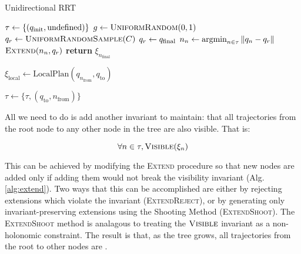 \documentclass[conference]{IEEEtran}
\newcommand{\argmin}{\operatornamewithlimits{argmin}}
\begin{document}
\begin{algorithm}
\caption{Unidirectional RRT}\label{alg:RRT}
\begin{algorithmic}[1]
   \State$\tau \gets \{(q_{\text{init}}, \text{undefined})\}$
       \State $g \gets \textsc{UniformRandom}(0, 1)$  
       		\State $q_r \gets \textsc{UniformRandomSample}(C)$
       \Else
       		 \State $q_r \gets q_{\text{final}}$
       \EndIf
       \State $n_n \gets \argmin_{n \in \tau} \|q_n - q_r\|$
       \State $\textsc{Extend}(n_n, q_r)$ 
   \EndWhile
   \State \textbf{return} $\xi_{n_{\text{final}}}$
\EndProcedure

    \State $\xi_{\text{local}}  \gets \text{LocalPlan}(q_{n_{\text{from}}},
    q_{\text{to}})$
    
         \State $\tau \gets \{\tau, (q_{\text{to}}, n_{\text{from}})\}$
    \EndIf    
\EndProcedure

\end{algorithmic}
\end{algorithm}

All we need to do is add another invariant to maintain: that all
trajectories from the root node to any other node in the tree are also
visible. That is:

\begin{equation}
    \forall n \in \tau, \textsc{Visible}(\xi_n)
\end{equation} 

This can be achieved by modifying the \textsc{Extend} procedure so that new
nodes are added only if adding them would not break the visibility invariant
(Alg. \ref{alg:extend}).
Two ways that this can be accomplished are either by rejecting extensions which
violate the invariant (\textsc{ExtendReject}), or by generating only
invariant-preserving extensions using the Shooting Method
(\textsc{ExtendShoot}). The \textsc{ExtendShoot} method is analagous to treating
the $\textsc{Visible}$ invariant as a non-holonomic constraint. The result is that, as the
tree grows, all trajectories from the root to other nodes are \vis.
\end{document}
